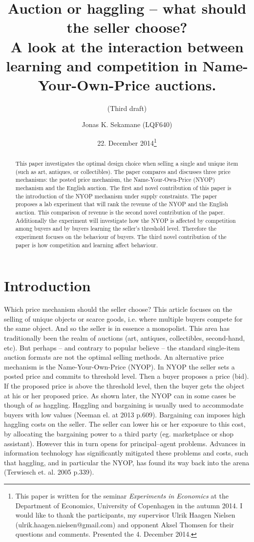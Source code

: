 \documentclass[a4paper,12pt]{article}
\title{\Large {\bf Auction or haggling -- what should the seller choose?} \\ A look at the interaction between learning and competition in Name-Your-Own-Price auctions.}
\subtitle{(Third draft)}
\author{Jonas K. Sekamane (LQF640)}
\date{22. December 2014\thanks{This paper is written for the seminar \emph{Experiments in Economics} at the Department of Economics, University of Copenhagen in the autumn 2014. I would like to thank the participants, my supervisor Ulrik Haagen Nielsen (ulrik.haagen.nielsen@gmail.com) and opponent Aksel Thomsen for their questions and comments. Presented the 4. December 2014.}}
\makeatletter
\renewcommand\tableofcontents{%
    \@starttoc{toc}%
}
\makeatother
\begin{document}
	
	\clearpage
	\thispagestyle{empty}
	
	\maketitle{}
		
	\newpage
	
	\begin{abstract}
		{This paper investigates the optimal design choice when selling a single and unique item (such as art, antiques, or collectibles). The paper compares and discusses three price mechanisms: the posted price mechanism, the Name-Your-Own-Price (NYOP) mechanism and the English auction. The first and novel contribution of this paper is the introduction of the NYOP mechanism under supply constraints. The paper proposes a lab experiment that will rank the revenue of the NYOP and the English auction. This comparison of revenue is the second novel contribution of the paper. Additionally the experiment will investigate how the NYOP is affected by competition among buyers and by buyers learning the seller's threshold level. Therefore the experiment focuses on the behaviour of buyers. The third novel contribution of the paper is how competition and learning affect behaviour.}
	\end{abstract}
	
	\tableofcontents
	
	\newpage
	
	\clearpage %
	\setcounter{page}{1}

	\section{Introduction}

	Which price mechanism should the seller choose? This article focuses on the selling of unique objects or scarce goods, i.e. where multiple buyers compete for the same object. And so the seller is in essence a monopolist. This area has traditionally been the realm of auctions (art, antiques, collectibles, second-hand, etc). But perhaps -- and contrary to popular believe -- the standard single-item auction formats are not the optimal selling methods. An alternative price mechanism is the Name-Your-Own-Price (NYOP). In NYOP the seller sets a posted price and commits to threshold level. Then a buyer proposes a price (bid). If the proposed price is above the threshold level, then the buyer gets the object at his or her proposed price. As shown later, the NYOP can in some cases be though of as haggling. Haggling and bargaining is usually used to accommodate buyers with low values (Neeman el. at 2013 p.609). Bargaining can imposes high haggling costs on the seller. The seller can lower his or her exposure to this cost, by allocating the bargaining power to a third party (eg. marketplace or shop assistant). However this in turn opens for principal–agent problems. Advances in information technology has significantly mitigated these problems and costs, such that haggling, and in particular the NYOP, has found its way back into the arena (Terwiesch et. al. 2005 p.339).
	
\end{document}
